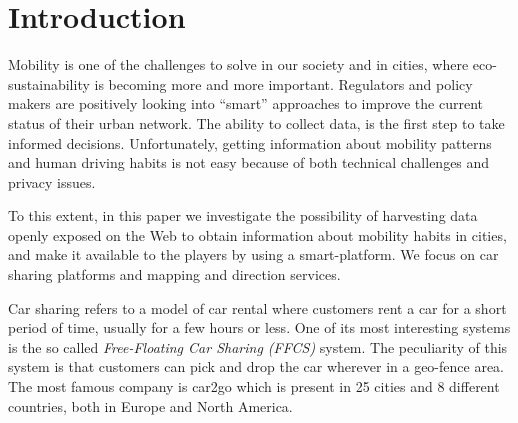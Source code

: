 \section{Introduction}
\label{sec:intro}

Mobility is one of the challenges to solve in our society and in cities, where eco-sustainability is becoming more and more important. 
Regulators and policy makers are positively looking into ``smart'' approaches to improve the current status of their urban network.  The ability to collect data, is the first step to take informed decisions. Unfortunately, getting information about mobility patterns and human driving habits is not easy because of both technical challenges and privacy issues.

To this extent, in this paper we investigate the possibility of harvesting data openly exposed on the Web to obtain information about mobility habits in cities, and make it available to the players by using a smart-platform. We focus on car sharing platforms and mapping and direction services.
%
%


Car sharing refers to a model of car rental where customers rent a car for a short period of time, usually for a few hours or less. One of its most interesting systems is the so called \textit{Free-Floating Car Sharing (FFCS)} system. The peculiarity of this system is that customers can pick and drop the car wherever in a geo-fence area.
The most famous company is car2go which is present in 25 cities and 8 different countries, both in Europe and North America.

